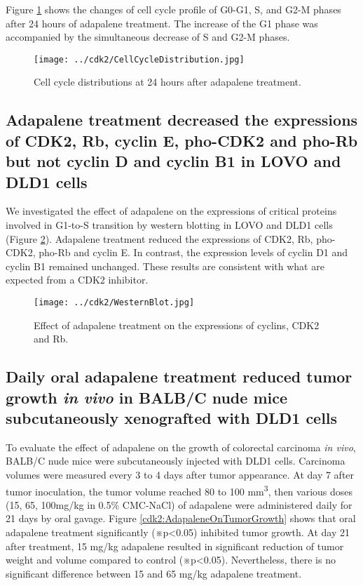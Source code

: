 Figure \ref{cdk2:CellCycleDistribution} shows the changes of cell cycle profile of G0-G1, S, and G2-M phases after 24 hours of adapalene treatment. The increase of the G1 phase was accompanied by the simultaneous decrease of S and G2-M phases.

\begin{figure}
\centering
\texttt{[image: ../cdk2/CellCycleDistribution.jpg]}
\caption{Cell cycle distributions at 24 hours after adapalene treatment.}
\label{cdk2:CellCycleDistribution}
\end{figure}

\subsection{Adapalene treatment decreased the expressions of CDK2, Rb, cyclin E, pho-CDK2 and pho-Rb but not cyclin D and cyclin B1 in LOVO and DLD1 cells}

We investigated the effect of adapalene on the expressions of critical proteins involved in G1-to-S transition by western blotting in LOVO and DLD1 cells (Figure \ref{cdk2:WesternBlot}). Adapalene treatment reduced the expressions of CDK2, Rb, pho-CDK2, pho-Rb and cyclin E. In contrast, the expression levels of cyclin D1 and cyclin B1 remained unchanged. These results are consistent with what are expected from a CDK2 inhibitor.

\begin{figure}
\centering
\texttt{[image: ../cdk2/WesternBlot.jpg]}
\caption{Effect of adapalene treatment on the expressions of cyclins, CDK2 and Rb.}
\label{cdk2:WesternBlot}
\end{figure}

\subsection{Daily oral adapalene treatment reduced tumor growth \textit{in vivo} in BALB/C nude mice subcutaneously xenografted with DLD1 cells}

To evaluate the effect of adapalene on the growth of colorectal carcinoma \textit{in vivo}, BALB/C nude mice were subcutaneously injected with DLD1 cells. Carcinoma volumes were measured every 3 to 4 days after tumor appearance. At day 7 after tumor inoculation, the tumor volume reached 80 to 100 mm\textsuperscript{3}, then various doses (15, 65, 100mg/kg in 0.5\% CMC-NaCl) of adapalene were administered daily for 21 days by oral gavage. Figure \ref{cdk2:AdapaleneOnTumorGrowth} shows that oral adapalene treatment significantly (※p<0.05) inhibited tumor growth. At day 21 after treatment, 15 mg/kg adapalene resulted in significant reduction of tumor weight and volume compared to control (※p<0.05). Nevertheless, there is no significant difference between 15 and 65 mg/kg adapalene treatment.

